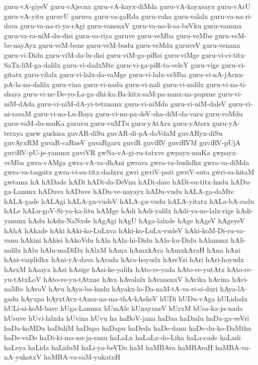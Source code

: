 {guru-vA-giyeV
guru-vAjecnx
guru-vA-kayx-diMda
guru-vA-kayxsayx
guru-vArU
guru-vA-yitu
guruvU
guruva
guru-va-gaRda
guru-vaha
guru-valalx
guru-va-na-ri-dava
guru-va-na-ri-ya-rAgi
guru-vanenxV
guru-va-no-li-sa-beVku
guru-vanunx
guru-va-ra-niM-du-disi
guru-va-riya
guruve
guru-veMba
guru-veMbe
guru-veM-be-nayAyx
guru-veM-bene
guru-veM-budu
guru-veMdu
guruveV
guru-venanx
guru-vi-Didu
guru-viM-da-lu-disi
guru-viM-ga-piRsi
guru-viMge
guru-vi-ci-titx-SaTx-liM-ga-dalilx
guru-vi-dadxMte
guru-vi-ga-piR-ta-veleY
guru-vige
guru-vi-gitatx
guru-vilalx
guru-vi-lalx-da-vaMge
guru-vi-lalx-veMba
guru-vi-nA-jAcnx-pA-la-na-dalilx
guru-vina
guru-vi-nadu
guru-vi-nali
guru-vi-nalilx
guru-vi-na-ti-shaya
guru-vi-ne-De-yo-La-ga-dhi-ka-Ba-kitx-saM-pa-nanx-na-papxne
guru-vi-niM-dAda
guru-vi-niM-dA-yi-tetxnanx
guru-vi-niMda
guru-vi-niM-daleV
guru-vi-ni-ravaM
guru-vi-no-Lu-Baya
guru-vi-nu-pa-deV-sha-diM-da-varu
guru-voMdu
guru-voM-du-muKa
guruvu
guru-vuMTu
guru-yAtArx
guru-yAterx
guru-yA-terxya
gurw
gushisa
guvAR-diSu
guvAR-di-pA-doVdaM
guvARyx-diSu
guvAyxRM
guvaR-caRneV
guvaRgarx
guviR
guviRV
guviRVM
guviRV-pUjA
guviRV-pU-je-yanunx
guviVR
gwNa-vA-gi-ru-tatxve
gwpayx-muKa
gwpayx-veMba
gwra-vAMga
gwra-vA-va-dhAni
gwrava
gwra-va-budidhx
gwra-va-diMda
gwra-va-taqpitx
gwra-vi-su-titx-dadxru
gwri
gwriV-pati
gwriV-suta
gwri-sa-hitaM
gwtama
hA
hADade
hADi
hADi-da-DeVnu
hADi-dare
hADi-su-titx-hudu
hADu-ga-Lanunx
hADuva
hADuve
hADu-ve-nayayx
hADu-vudu
hALA-ga-daMte
hALA-gade
hALAgi
hALA-gu-vudeV
hALA-gu-vudu
hALA-yitatx
hALa-bA-radu
hALe
hALu-goV-Si-ya-ka-litu
hAMge
hAdi
hAdi-yalilx
hAdi-ya-ne-lalx-rige
hAdi-yanunx
hAdu
hAdu-NaNxde
hAgAgi
hAgU
hAga-lalxde
hAge
hAgeV
hAgeyeV
hAhA
hAkade
hAki
hAki-ko-LuLxva
hAki-ko-LuLx-vudeV
hAki-koM-Di-ru-va-vanu
hAkini
hAkisi
hAkoVdu
hAla
hAla-hi-Didu
hAla-ku-Didu
hAlanunx
hAli-nalilx
hAlu
hAlu-maDiDx
hAlxM
hAmx
hAmxkAra
hAmxkAraH
hAna
hAni
hAni-vaqdidhx
hAni-yA-dava
hArada
hAra-hoyudx
hAreYsi
hAri
hAri-hoyudx
hArxM
hAsayx
hAsi
hAsige
hAsi-ke-yalilx
hAto-re-yada
hAto-re-yutAtx
hAto-re-yu-tAtxLoV
hAto-re-yu-tAtxne
hAva
hAvalalx
hAvanenxV
hAvika
hAvina
hAvi-naMte
hAvoV
hAvu
hAya-ba-hudu
hAyakx-lo-Da-naM-tA-va-ri-si-duri
hAya-lA-gadu
hAyxpa
hAyxtAvx-tAmx-na-ma-thA-kAsheV
hUDi
hUDu-vAga
hULidadx
hULi-si-koM-bave
hUga-Lanunx
hUmAle
hUnayxneV
hUrxM
hUsa-ka-ja-nada
hUsuve
hUvi-lalxda
hUvina
hUvu
ha
haBoV-jana
haDaa
haDadu
haDa-ga-veVri
haDa-koMDu
haDaliM
haDapa
haDapu
haDeda
haDe-danu
haDe-du-ko-DaMtha
haDe-vaDe
haDi-ki-ma-nu-ja-ranu
haLaLx
haLaLx-do-Liha
haLa-cade
haLadi
haLeya
haLida
haLiduM
haLi-ya-beVDa
haM
haMBAva
haMBAvaH
haMBA-va-nA-yukotxV
haMBA-va-saM-yukatxH
}
